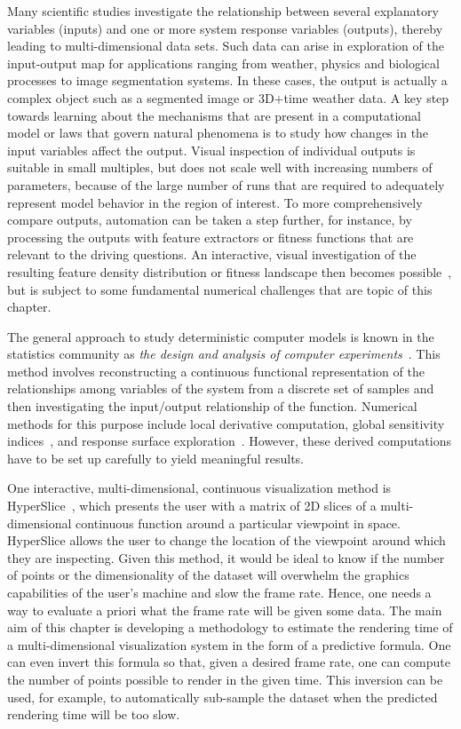 


Many scientific studies investigate the relationship between
several explanatory variables (inputs) and one or more system response
variables (outputs), thereby leading to multi-dimensional data sets.  Such data
can arise in exploration of the input-output map for applications ranging from
weather, physics and biological processes to image segmentation systems.  
In these cases, the output
is actually a complex object such as a segmented image or 3D+time weather data.
A key step towards learning about the mechanisms that are present in a
computational model or laws that govern natural phenomena is to study how
changes in the input variables affect the output.  Visual inspection of
individual outputs is suitable in small multiples, but does not scale well with
increasing numbers of parameters, because of the large number of runs that are
required to adequately represent model behavior in the region of interest.  To
more comprehensively compare outputs, automation can be taken a step further,
for instance, by processing the outputs with feature extractors or fitness
functions that are relevant to the driving questions.  An interactive, visual
investigation of the resulting feature density distribution or fitness
landscape then becomes
possible~\cite{Feiner:1990,Muhlbacher:2013,Piringer:2010}, but is subject to 
some fundamental numerical
challenges that are topic of this chapter.

The general approach to
study deterministic computer models is known in the statistics community as
\emph{the design and analysis of computer experiments}~\cite{Santner:2003}.
This method involves reconstructing a continuous functional representation of
the relationships among variables of the system from a discrete set of 
samples and then investigating the
input/output relationship of the function.  Numerical methods for
this purpose include local derivative computation, global sensitivity
indices~\cite{Saltelli:2008}, and response surface
exploration~\cite{Box:2007}.  However, these derived computations have to be
set up carefully to yield meaningful results. 

One interactive, multi-dimensional, continuous
visualization method
is HyperSlice~\cite{Wijk:1993}, which presents the user
with a matrix of 2D slices of a multi-dimensional continuous function
around a particular viewpoint in space.
HyperSlice allows the user to change the
location of the viewpoint around which they are inspecting.
Given this method, it would be ideal to know if the number of
points or the dimensionality of the dataset will overwhelm the
graphics capabilities of the user's machine and slow the frame rate. 
Hence, one needs a way to evaluate a priori what the frame rate will be
given some data. The main aim of this chapter is developing a methodology to 
estimate the rendering time of a multi-dimensional
visualization system in the form of a predictive formula.
One can even invert this formula so that, given a desired frame rate, 
one can compute the number of points 
possible to render in the given time.
This inversion can be used, for example, 
to automatically sub-sample the dataset when the predicted rendering 
time will be too slow.  


